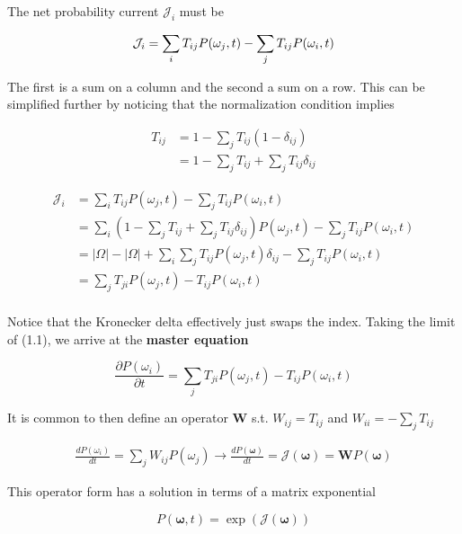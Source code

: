 \documentclass{ucetd}
\begin{document}
The net probability current $\mathcal{J}_{i}$ must be 

\begin{equation*}
\mathcal{J}_{i} = \sum_{i}T_{ij}P(\omega_{j},t) - \sum_{j}T_{ij}P(\omega_{i},t)\\
\end{equation*}

The first is a sum on a column and the second a sum on a row. This can be simplified further by noticing that the normalization condition implies

\begin{align*}
T_{ij} &= 1 - \sum_{j}T_{ij}(1-\delta_{ij})\\
&= 1 - \sum_{j}T_{ij} + \sum_{j}T_{ij}\delta_{ij}
\end{align*}


\begin{align*}
\mathcal{J}_{i} &= \sum_{i}T_{ij}P(\omega_{j},t) - \sum_{j}T_{ij}P(\omega_{i},t)\\
&= \sum_{i}\left(1 - \sum_{j}T_{ij} + \sum_{j}T_{ij}\delta_{ij}\right)P(\omega_{j},t) - \sum_{j}T_{ij}P(\omega_{i},t)\\
&= |\Omega| - |\Omega| + \sum_{i}\sum_{j}T_{ij}P(\omega_{j},t)\delta_{ij} - \sum_{j}T_{ij}P(\omega_{i},t)\\
&= \sum_{j}T_{ji}P(\omega_{j},t) - T_{ij}P(\omega_{i},t)\\
\end{align*}

Notice that the Kronecker delta effectively just swaps the index. Taking the limit of (1.1), we arrive at the \textbf{master equation}


\begin{equation*}
\frac{\partial P(\omega_{i})}{\partial t} = \sum_{j}T_{ji}P(\omega_{j},t) - T_{ij}P(\omega_{i},t)
\end{equation*}

It is common to then define an operator $\bm{W}$ s.t. $W_{ij} = T_{ij}$ and $W_{ii} = -\sum_{j}T_{ij}$ 

\begin{align*}
\frac{dP(\omega_{i})}{dt} = \sum_{j}W_{ij}P(\omega_{j}) \rightarrow \frac{dP(\bm{\omega})}{dt} = \mathcal{J}(\bm{\omega}) = \mathbf{W}P(\bm{\omega})
\end{align*}

This operator form has a solution in terms of a matrix exponential

\begin{equation*}
P(\bm{\omega}, t) = \exp(\mathcal{J}(\bm{\omega}))
\end{equation*}
\end{document}

